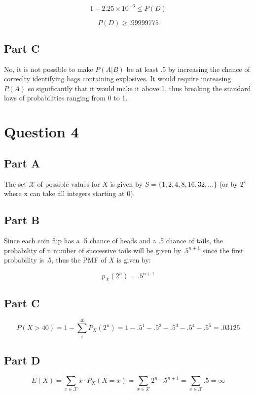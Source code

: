 \documentclass[letterpaper]{article}
\begin{document}
$$1 - 2.25 \times 10^{-6} \leq P(D)$$

$$P(D) \geq .99999775$$

\subsection*{Part C}

No, it is not possible to make $P(A|B)$ be at least .5 by increasing the chance of correclty identifying bags containing explosives. It would require increasing $P(A)$ so significantly that it would make it above 1, thus breaking the standard laws of probabilities ranging from 0 to 1.

\newpage

\section*{Question 4}

\subsection*{Part A}

The set $\mathcal{X}$ of possible values for $X$ is given by $S = \{ 1, 2, 4, 8, 16, 32, ...\}$ (or by $2^x$ where x can take all integers starting at 0).

\subsection*{Part B}

Since each coin flip has a .5 chance of heads and a .5 chance of tails, the probability of n number of successive tails will be given by $.5^{n + 1}$ since the first probability is .5, thus the PMF of $X$ is given by:

$$p_{X}(2^n) = .5^{n+1}$$

\subsection*{Part C}

$$P(X > 40) = 1 - \sum_i^{40} P_X(2^n) = 1 - .5^{1} - .5^{2} - .5^{3} - .5^{4}- .5^{5} = .03125$$

\subsection*{Part D}

$$E(X) = \sum_{x \in \mathcal{X}} x \cdot P_X (X = x) = \sum_{x \in \mathcal{X}} 2^n \cdot .5^{n + 1} = \sum_{x \in \mathcal{X}} .5 = \infty$$
\end{document}
